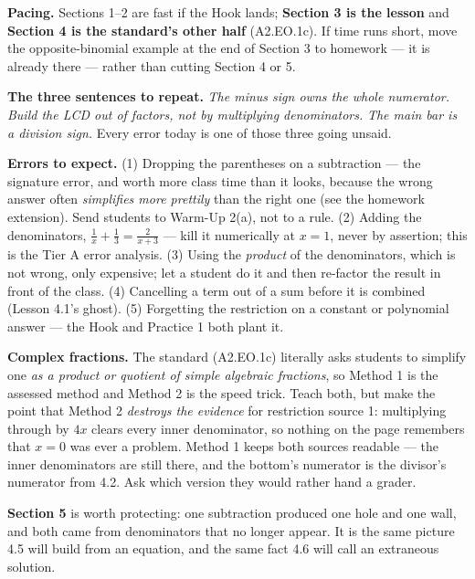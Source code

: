 \documentclass[10pt]{article}
\begin{document}
\begin{teachernote}
\textbf{Pacing.} Sections 1--2 are fast if the Hook lands; \textbf{Section 3 is the lesson} and
\textbf{Section 4 is the standard's other half} (A2.EO.1c). If time runs short, move the
opposite-binomial example at the end of Section 3 to homework --- it is already there --- rather than
cutting Section 4 or 5.

\vspace{3pt}
\textbf{The three sentences to repeat.} \emph{The minus sign owns the whole numerator.} \emph{Build the
LCD out of factors, not by multiplying denominators.} \emph{The main bar is a division sign.} Every
error today is one of those three going unsaid.

\vspace{3pt}
\textbf{Errors to expect.} (1) Dropping the parentheses on a subtraction --- the signature error, and
worth more class time than it looks, because the wrong answer often \emph{simplifies more prettily}
than the right one (see the homework extension). Send students to Warm-Up 2(a), not to a rule.
(2) Adding the denominators, $\frac1x+\frac13=\frac{2}{x+3}$ --- kill it numerically at $x=1$, never by
assertion; this is the Tier A error analysis. (3) Using the \emph{product} of the denominators, which
is not wrong, only expensive; let a student do it and then re-factor the result in front of the class.
(4) Cancelling a term out of a sum before it is combined (Lesson 4.1's ghost). (5) Forgetting the
restriction on a constant or polynomial answer --- the Hook and Practice 1 both plant it.

\vspace{3pt}
\textbf{Complex fractions.} The standard (A2.EO.1c) literally asks students to simplify one \emph{as a
product or quotient of simple algebraic fractions}, so Method 1 is the assessed method and Method 2 is
the speed trick. Teach both, but make the point that Method 2 \emph{destroys the evidence} for
restriction source 1: multiplying through by $4x$ clears every inner denominator, so nothing on the
page remembers that $x=0$ was ever a problem. Method 1 keeps both sources readable --- the inner
denominators are still there, and the bottom's numerator is the divisor's numerator from 4.2. Ask which
version they would rather hand a grader.

\vspace{3pt}
\textbf{Section 5} is worth protecting: one subtraction produced one hole and one wall, and both came
from denominators that no longer appear. It is the same picture 4.5 will build from an equation, and
the same fact 4.6 will call an extraneous solution.
\end{teachernote}
\end{document}
